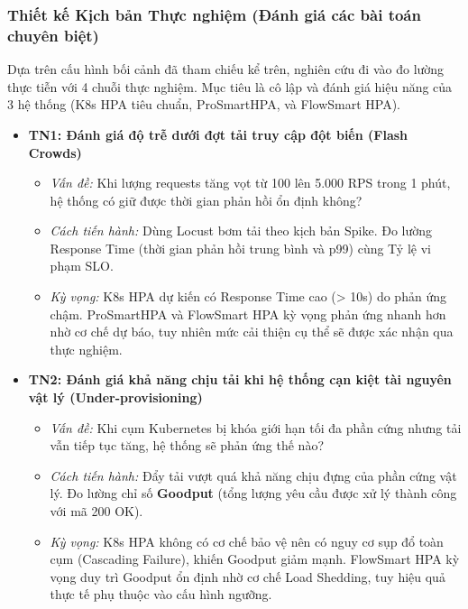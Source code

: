 \documentclass[14pt]{article}
\begin{document}
\subsubsection{Thiết kế Kịch bản Thực nghiệm (Đánh giá các bài toán chuyên biệt)}

Dựa trên cấu hình bối cảnh đã tham chiếu kể trên, nghiên cứu đi vào đo lường thực tiễn với 4 chuỗi thực nghiệm. Mục tiêu là cô lập và đánh giá hiệu năng của 3 hệ thống (K8s HPA tiêu chuẩn, ProSmartHPA, và FlowSmart HPA).

\begin{itemize}[leftmargin=1.5cm, label=\textbullet]
    \item \textbf{TN1: Đánh giá độ trễ dưới đợt tải truy cập đột biến (Flash Crowds)}
    \begin{itemize}[label=--]
        \item \textit{Vấn đề:} Khi lượng requests tăng vọt từ 100 lên 5.000 RPS trong 1 phút, hệ thống có giữ được thời gian phản hồi ổn định không?
        \item \textit{Cách tiến hành:} Dùng Locust bơm tải theo kịch bản Spike. Đo lường Response Time (thời gian phản hồi trung bình và p99) cùng Tỷ lệ vi phạm SLO.
        \item \textit{Kỳ vọng:} K8s HPA dự kiến có Response Time cao (> 10s) do phản ứng chậm. ProSmartHPA và FlowSmart HPA kỳ vọng phản ứng nhanh hơn nhờ cơ chế dự báo, tuy nhiên mức cải thiện cụ thể sẽ được xác nhận qua thực nghiệm.
    \end{itemize}
    
    \item \textbf{TN2: Đánh giá khả năng chịu tải khi hệ thống cạn kiệt tài nguyên vật lý (Under-provisioning)}
    \begin{itemize}[label=--]
        \item \textit{Vấn đề:} Khi cụm Kubernetes bị khóa giới hạn tối đa phần cứng nhưng tải vẫn tiếp tục tăng, hệ thống sẽ phản ứng thế nào?
        \item \textit{Cách tiến hành:} Đẩy tải vượt quá khả năng chịu đựng của phần cứng vật lý. Đo lường chỉ số \textbf{Goodput} (tổng lượng yêu cầu được xử lý thành công với mã 200 OK).
        \item \textit{Kỳ vọng:} K8s HPA không có cơ chế bảo vệ nên có nguy cơ sụp đổ toàn cụm (Cascading Failure), khiến Goodput giảm mạnh. FlowSmart HPA kỳ vọng duy trì Goodput ổn định nhờ cơ chế Load Shedding, tuy hiệu quả thực tế phụ thuộc vào cấu hình ngưỡng.
    \end{itemize}


\end{itemize}
\end{document}
